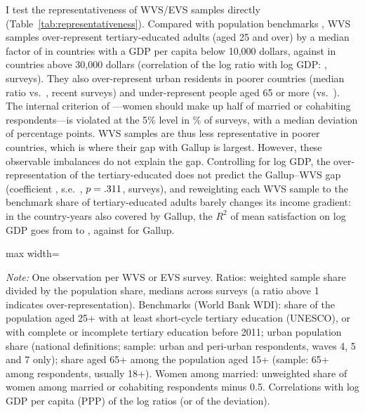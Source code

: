 \documentclass[12pt]{article}
\begin{document}
I test the representativeness of WVS/EVS samples directly (Table~\ref{tab:representativeness}). Compared with population benchmarks \citep{barro_new_2013,worldbank_wdi_2026}, WVS samples over-represent tertiary-educated adults (aged 25 and over) by a median factor of \ratioTertiaryLow in countries with a GDP per capita below 10,000 dollars, against \ratioTertiaryHigh in countries above 30,000 dollars (correlation of the log ratio with log GDP: \corTertiaryGDP, \nCompositionSurveys surveys). They also over-represent urban residents in poorer countries (median ratio \ratioUrbanLow vs.\ \ratioUrbanHigh, \nUrbanSurveys recent surveys) and under-represent people aged 65 or more (\ratioOldLow vs.\ \ratioOldHigh). The internal criterion of \citet{kohler_surveys_2007}---women should make up half of married or cohabiting respondents---is violated at the 5\% level in \shareGenderFlag\% of surveys, %
with a median deviation of \medianGenderDeviation percentage points. WVS samples are thus less representative in poorer countries, which is where their gap with Gallup is largest. However, these observable imbalances do not explain the gap. Controlling for log GDP, the over-representation of the tertiary-educated does not predict the Gallup--WVS gap (coefficient \coefTertiaryGap, s.e.\ \seTertiaryGap, $p = .311$, \nGapComposition surveys), and reweighting each WVS sample to the benchmark share of tertiary-educated adults barely changes its income gradient: in the country-years also covered by Gallup, the $R^2$ of mean satisfaction on log GDP goes from \RtwoCommonWVSraw to \RtwoCommonWVSeduAdj, against \RtwoCommonGallupSub for Gallup.

\begin{table}[htbp]
    \centering
    \caption{Representativeness of WVS/EVS samples: sample shares relative to population benchmarks.}\label{tab:representativeness}
    \begin{adjustbox}{max width=\textwidth}
    
    \end{adjustbox}
    \begin{minipage}{\textwidth}\footnotesize \textit{Note:} One observation per WVS or EVS survey. Ratios: weighted sample share divided by the population share, medians across surveys (a ratio above 1 indicates over-representation). Benchmarks (World Bank WDI): share of the population aged 25+ with at least short-cycle tertiary education (UNESCO), or with complete or incomplete tertiary education \citep{barro_new_2013} before 2011; urban population share (national definitions; sample: urban and peri-urban respondents, waves 4, 5 and 7 only); share aged 65+ among the population aged 15+ (sample: 65+ among respondents, usually 18+). Women among married: unweighted share of women among married or cohabiting respondents minus 0.5. Correlations with log GDP per capita (PPP) of the log ratios (or of the deviation).\end{minipage}
\end{table}
\end{document}
